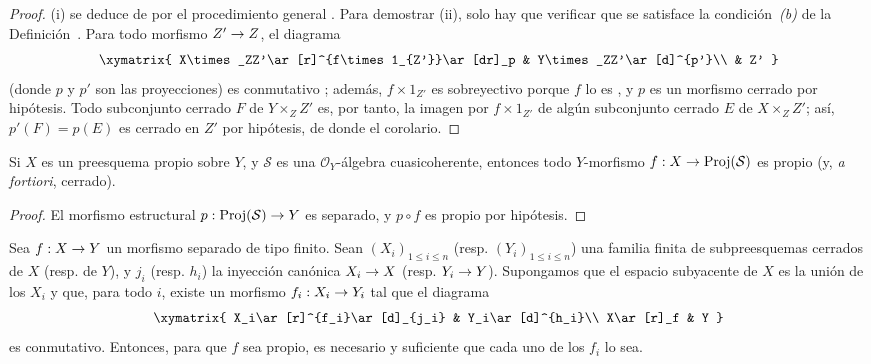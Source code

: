 \documentclass[oneside,10pt]{amsart}
\makeatletter
\renewcommand{\leq}{\leqslant}
\newcommand{\ega@arrow}[2]{\mathchoice{#1}{#2}{#2}{#2}}
\renewcommand{\to}{\ega@arrow{\longrightarrow}{\rightarrow}}
\let\EGAOriginalLabel\label
\renewcommand{\label}[1]{\phantomsection\EGAOriginalLabel{#1}}
\makeatother
\begin{document}
\begin{proof}
(i) se deduce de  por el procedimiento general .
Para demostrar (ii), solo hay que verificar que se satisface la condición~\emph{(b)} de la Definición~.
Para todo morfismo $Z'\to Z$, el diagrama
\[
  \xymatrix{
    X\times_ZZ'\ar[r]^{f\times1_{Z'}}\ar[dr]_p &
    Y\times_ZZ'\ar[d]^{p'}\\
    & Z'
  }
\]
(donde $p$ y $p'$ son las proyecciones) es conmutativo ;
además, $f\times1_{Z'}$ es sobreyectivo porque $f$ lo es , y $p$ es un morfismo cerrado por hipótesis.
Todo subconjunto cerrado $F$ de $Y\times_ZZ'$ es, por tanto, la imagen por $f\times1_{Z'}$ de algún subconjunto cerrado $E$ de $X\times_ZZ'$; así, $p'(F)=p(E)$ es cerrado en $Z'$ por hipótesis, de donde el corolario.
\end{proof}

\begin{corollary}[5.4.4]
\label{II.5.4.4-fr}
Si $X$ es un preesquema propio sobre $Y$, y $\mathcal{S}$ es una $\mathcal{O}_Y$-álgebra cuasicoherente, entonces todo $Y$-morfismo $f:X\to\operatorname{Proj}(\mathcal{S})$ es propio (y, \emph{a fortiori}, cerrado).
\end{corollary}

\begin{proof}
El morfismo estructural $p:\operatorname{Proj}(\mathcal{S})\to Y$ es separado, y $p\circ f$ es propio por hipótesis.
\end{proof}

\begin{corollary}[5.4.5]
\label{II.5.4.5-fr}
Sea $f:X\to Y$ un morfismo separado de tipo finito.
Sean $(X_i)_{1\leq i\leq n}$ \textup{(resp. $(Y_i)_{1\leq i\leq n}$)} una familia finita de subpreesquemas cerrados de $X$ \textup{(resp. de $Y$)}, y $j_i$ \textup{(resp. $h_i$)} la inyección canónica $X_i\to X$ \textup{(resp. $Y_i\to Y$)}.
Supongamos que el espacio subyacente de $X$ es la unión de los $X_i$ y que, para todo $i$, existe un morfismo $f_i:X_i\to Y_i$ tal que el diagrama
\[
  \xymatrix{
    X_i\ar[r]^{f_i}\ar[d]_{j_i} & Y_i\ar[d]^{h_i}\\
    X\ar[r]_f & Y
  }
\]
es conmutativo.
Entonces, para que $f$ sea propio, es necesario y suficiente que cada uno de los $f_i$ lo sea.
\end{corollary}
\end{document}
